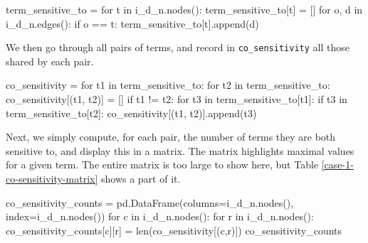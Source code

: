 \begin{pycode}
term_sensitive_to = {}
for t in i_d_n.nodes():
    term_sensitive_to[t] = []
    for o, d in i_d_n.edges():
        if o == t:
            term_sensitive_to[t].append(d)
\end{pycode}

We then go through all pairs of terms, and record in \verb|co_sensitivity| all those shared by each pair.

\begin{pycode}
co_sensitivity = {}
for t1 in term_sensitive_to:
    for t2 in term_sensitive_to:
        co_sensitivity[(t1, t2)] = []
        if t1 != t2:
            for t3 in term_sensitive_to[t1]:
                if t3 in term_sensitive_to[t2]:
                    co_sensitivity[(t1, t2)].append(t3)
\end{pycode}

Next, we simply compute, for each pair, the number of terms they are both sensitive to, and display this in a matrix. The matrix highlights maximal values for a given term. The entire matrix is too large to show here, but Table \ref{case-1-co-sensitivity-matrix} shows a part of it.

\begin{pycode}
co_sensitivity_counts = pd.DataFrame(columns=i_d_n.nodes(), index=i_d_n.nodes())
for c in i_d_n.nodes():
    for r in i_d_n.nodes():
        co_sensitivity_counts[c][r] = len(co_sensitivity[(c,r)])
co_sensitivity_counts
\end{pycode}



